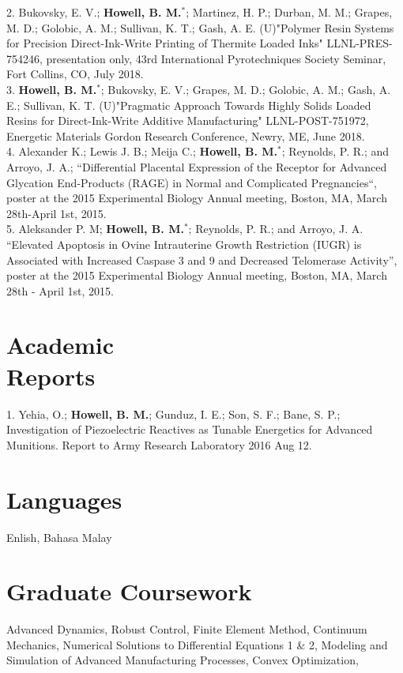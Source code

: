 \documentclass[margin,line]{res}
\begin{document}
\begin{resume}
2. Bukovsky, E. V.; \textbf{Howell, B. M.}$^*$; Martinez, H. P.; Durban, M. M.; Grapes, M. D.; Golobic, A. M.; Sullivan, K. T.; Gash, A. E. (U)"Polymer Resin Systems for Precision Direct-Ink-Write Printing of Thermite Loaded Inks" LLNL-PRES-754246, presentation only, 43rd International Pyrotechniques Society Seminar, Fort Collins, CO, July 2018.\\

3. \textbf{Howell, B. M.}$^*$; Bukovsky, E. V.; Grapes, M. D.; Golobic, A. M.; Gash, A. E.; Sullivan, K. T. (U)"Pragmatic Approach Towards Highly Solids Loaded Resins for Direct-Ink-Write Additive Manufacturing" LLNL-POST-751972, Energetic Materials Gordon Research Conference, Newry, ME, June 2018.\\

4. Alexander K.; Lewis J. B.; Meija C.; \textbf{Howell, B. M.}$^*$; Reynolds, P. R.; and Arroyo, J. A.; “Differential Placental Expression of the Receptor for Advanced Glycation End-Products (RAGE) in Normal and Complicated Pregnancies“, poster at the 2015 Experimental Biology Annual meeting, Boston, MA, March 28th-April 1st, 2015.\\

5. Aleksander P. M; \textbf{Howell, B. M.}$^*$; Reynolds, P. R.; and Arroyo, J. A. “Elevated Apoptosis in Ovine Intrauterine Growth Restriction (IUGR) is Associated with Increased Caspase 3 and 9 and Decreased Telomerase Activity”, poster at the 2015 Experimental Biology Annual meeting, Boston, MA, March 28th - April 1st, 2015.\\

\section{\sc Academic \\ Reports}
1. Yehia, O.; \textbf{Howell, B. M.}; Gunduz, I. E.; Son, S. F.; Bane, S. P.; Investigation of Piezoelectric Reactives as Tunable Energetics for Advanced Munitions. Report to Army Research Laboratory 2016 Aug 12.

\section{\sc Languages}
Enlish, Bahasa Malay\\

\section{\sc Graduate Coursework}
Advanced Dynamics, Robust Control, Finite Element Method, Continuum Mechanics, Numerical Solutions to Differential Equations 1 \& 2, Modeling and Simulation of Advanced Manufacturing Processes, Convex Optimization, 
\\

\end{resume}
\end{document}
